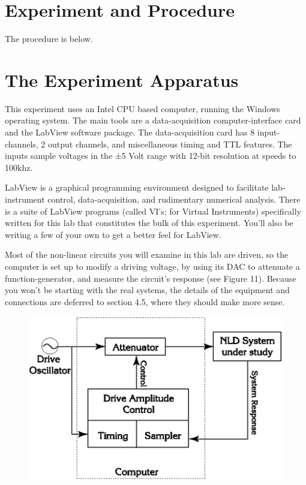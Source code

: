 \documentclass{../lab}
\begin{document}
\section{Experiment and Procedure}

The procedure is below.

\section{The Experiment Apparatus}

This experiment uses an Intel CPU based computer, running the Windows operating system. The main tools are a data-acquisition computer-interface card and the LabView software package. The data-acquisition card has 8 input-channels, 2 output channels, and miscellaneous timing and TTL features. The inputs sample voltages in the ±5 Volt range with 12-bit resolution at speeds to 100khz.

LabView is a graphical programming environment designed to facilitate lab-instrument control, data-acquisition, and rudimentary numerical analysis. There is a suite of LabView programs (called VI's; for Virtual Instruments) specifically written for this lab that constitutes the bulk of this experiment. You'll also be writing a few of your own to get a better feel for LabView.

Most of the non-linear circuits you will examine in this lab are driven, so the computer is set up to modify a driving voltage, by using its DAC to attenuate a function-generator, and measure the circuit's response (see Figure 11). Because you won't be starting with the real systems, the details of the equipment and connections are deferred to section 4.5, where they should make more sense.


\begin{figure}[h]
    \centering
    \href{http://experimentationlab.berkeley.edu/sites/default/files/images/Nldimage066.gif}{\includegraphics[width=0.5\linewidth]{images/Nldimage066.png}}
    \caption{}
    \label{fig:Nldimage066}
\end{figure}
\end{document}
